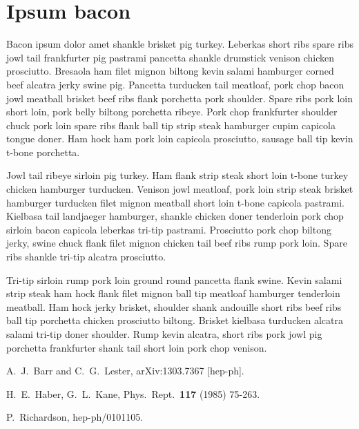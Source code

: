\documentclass[twocolumn,a4paper,10pt]{article}
\begin{document}
\section{Ipsum bacon}
Bacon ipsum dolor amet shankle brisket pig turkey. Leberkas short ribs spare ribs jowl tail frankfurter pig pastrami pancetta shankle drumstick venison chicken prosciutto. Bresaola ham filet mignon biltong kevin salami hamburger corned beef alcatra jerky swine pig. Pancetta turducken tail meatloaf, pork chop bacon jowl meatball brisket beef ribs flank porchetta pork shoulder. Spare ribs pork loin short loin, pork belly biltong porchetta ribeye. Pork chop frankfurter shoulder chuck pork loin spare ribs flank ball tip strip steak hamburger cupim capicola tongue doner. Ham hock ham pork loin capicola prosciutto, sausage ball tip kevin t-bone porchetta.

Jowl tail ribeye sirloin pig turkey. Ham flank strip steak short loin t-bone turkey chicken hamburger turducken. Venison jowl meatloaf, pork loin strip steak brisket hamburger turducken filet mignon meatball short loin t-bone capicola pastrami. Kielbasa tail landjaeger hamburger, shankle chicken doner tenderloin pork chop sirloin bacon capicola leberkas tri-tip pastrami. Prosciutto pork chop biltong jerky, swine chuck flank filet mignon chicken tail beef ribs rump pork loin. Spare ribs shankle tri-tip alcatra prosciutto.

Tri-tip sirloin rump pork loin ground round pancetta flank swine. Kevin salami strip steak ham hock flank filet mignon ball tip meatloaf hamburger tenderloin meatball. Ham hock jerky brisket, shoulder shank andouille short ribs beef ribs ball tip porchetta chicken prosciutto biltong. Brisket kielbasa turducken alcatra salami tri-tip doner shoulder. Rump kevin alcatra, short ribs pork jowl pig porchetta frankfurter shank tail short loin pork chop venison.



\begin{thebibliography}{9}


  A.~J.~Barr and C.~G.~Lester,
  arXiv:1303.7367 [hep-ph].

  H.~E.~Haber, G.~L.~Kane,
  Phys.\ Rept.\  {\bf 117 } (1985)  75-263.
  
  P.~Richardson,
  hep-ph/0101105.
  
\end{thebibliography}
\end{document}
